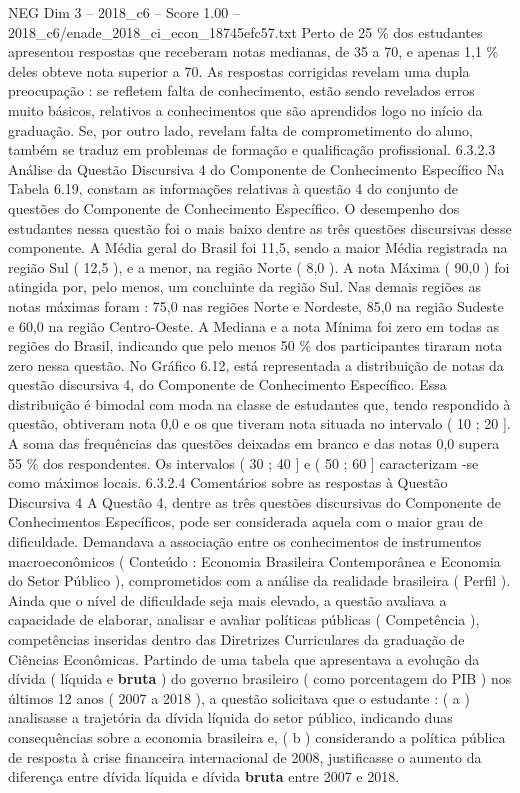 \begin{textsample}{NEG Dim 3 – 2018\_c6 – Score 1.00 – 2018\_c6/enade\_2018\_ci\_econ\_18745efc57.txt}
Perto de 25 \% dos estudantes apresentou respostas que receberam notas medianas, de 35 a 70, e apenas 1,1 \% deles obteve nota superior a 70.
As respostas corrigidas revelam uma dupla preocupação : se refletem falta de conhecimento, estão sendo revelados erros muito básicos, relativos a conhecimentos que são aprendidos logo no início da graduação.
Se, por outro lado, revelam falta de comprometimento do aluno, também se traduz em problemas de formação e qualificação profissional. 6.3.2.3 Análise da Questão Discursiva 4 do Componente de Conhecimento Específico Na Tabela 6.19, constam as informações relativas à questão 4 do conjunto de questões do Componente de Conhecimento Específico.
O desempenho dos estudantes nessa questão foi o mais baixo dentre as três questões discursivas desse componente.
A Média geral do Brasil foi 11,5, sendo a maior Média registrada na região Sul ( 12,5 ), e a menor, na região Norte ( 8,0 ).
A nota Máxima ( 90,0 ) foi atingida por, pelo menos, um concluinte da região Sul.
Nas demais regiões as notas máximas foram : 75,0 nas regiões Norte e Nordeste, 85,0 na região Sudeste e 60,0 na região Centro-Oeste.
A Mediana e a nota Mínima foi zero em todas as regiões do Brasil, indicando que pelo menos 50 \% dos participantes tiraram nota zero nessa questão.
No Gráfico 6.12, está representada a distribuição de notas da questão discursiva 4, do Componente de Conhecimento Específico.
Essa distribuição é bimodal com moda na classe de estudantes que, tendo respondido à questão, obtiveram nota 0,0 e os que tiveram nota situada no intervalo ( 10 ; 20 ].
A soma das frequências das questões deixadas em branco e das notas 0,0 supera 55 \% dos respondentes.
Os intervalos ( 30 ; 40 ] e ( 50 ; 60 ] caracterizam -se como máximos locais. 6.3.2.4 Comentários sobre as respostas à Questão Discursiva 4 A Questão 4, dentre as três questões discursivas do Componente de Conhecimentos Específicos, pode ser considerada aquela com o maior grau de dificuldade.
Demandava a associação entre os conhecimentos de instrumentos macroeconômicos ( Conteúdo : Economia Brasileira Contemporânea e Economia do Setor Público ), comprometidos com a análise da realidade brasileira ( Perfil ).
Ainda que o nível de dificuldade seja mais elevado, a questão avaliava a capacidade de elaborar, analisar e avaliar políticas públicas ( Competência ), competências inseridas dentro das Diretrizes Curriculares da graduação de Ciências Econômicas.
Partindo de uma tabela que apresentava a evolução da dívida ( líquida e \textbf{bruta} ) do governo brasileiro ( como porcentagem do PIB ) nos últimos 12 anos ( 2007 a 2018 ), a questão solicitava que o estudante : ( a ) analisasse a trajetória da dívida líquida do setor público, indicando duas consequências sobre a economia brasileira e, ( b ) considerando a política pública de resposta à crise financeira internacional de 2008, justificasse o aumento da diferença entre dívida líquida e dívida \textbf{bruta} entre 2007 e 2018.

\end{textsample}
